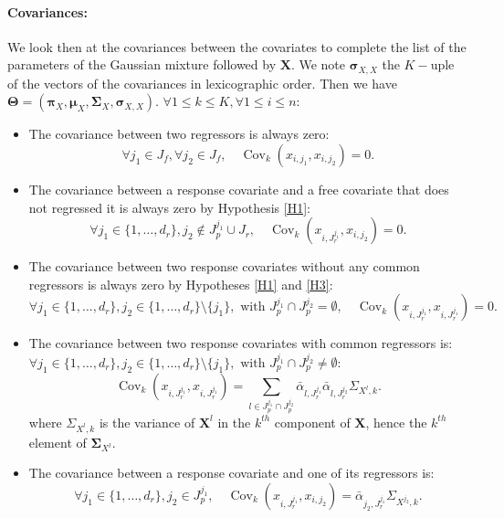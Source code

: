 \documentclass[12pt,a4paper]{report}
\begin{document}
\paragraph{Covariances:} We look then at the covariances between the covariates to complete the list of the parameters of the Gaussian mixture followed by $\boldsymbol{X}$.
We note $\boldsymbol{\sigma}_{X,X}$ the $K-$uple of the vectors of the covariances in lexicographic order. Then we have $\boldsymbol{\Theta}=(\boldsymbol{\pi}_X,\boldsymbol{\mu}_X,\boldsymbol{\Sigma}_X,\boldsymbol{\sigma}_{X,X})$. $\forall 1\leq k \leq K, \forall 1\leq i \leq n$:
\begin{itemize}
	\item The covariance between two regressors is always zero:
	\begin{equation}
		\forall j_1 \in J_f, \forall j_2 \in J_f, \quad   \operatorname{Cov}_k(x_{i,j_1},x_{i,j_2})=0. \nonumber 
	\end{equation}
	\item The covariance between a response covariate and a free covariate that does not regressed it is always zero by Hypothesis \ref{H1}:
	\begin{equation}
		\forall j_1 \in \{1,\dots,d_r \}, j_2 \notin J_p^{j_1}\cup J_r, \quad \operatorname{Cov}_k(x_{i,J_r^{j_1}},x_{i,j_2})=0. \nonumber 
	\end{equation}
	\item The covariance between two response covariates without any common regressors is always zero  by Hypotheses \ref{H1} and \ref{H3}:
	\begin{equation}
		\forall j_1 \in \{1,\dots,d_r \}, j_2 \in \{1,\dots, d_r \}\setminus\{ j_1 \}, \textrm{ with } J_p^{j_1}\cap J_p^{j_2}= \emptyset, \quad \operatorname{Cov}_k(x_{i,J_r^{j_1}},x_{i,J_r^{j_1}})=0. \nonumber 
	\end{equation}
	\item The covariance between two response covariates with common regressors is:\\
	$\forall j_1 \in \{1,\dots,d_r \}, j_2 \in \{1,\dots, d_r \}\setminus\{ j_1 \}, \textrm{ with } J_p^{j_1}\cap J_p^{j_2}\neq \emptyset$:
	\begin{equation}
	  \operatorname{Cov}_k(x_{i,J_r^{j_1}},x_{i,J_r^{j_1}})=\sum_{l \in J_p^{j_1}\cap J_p^{j_2}}\bar{\alpha}_{l,J_r^{j_1}}\bar{\alpha}_{l,J_r^{j_2}}\Sigma_{X^l,k} . \nonumber 
	\end{equation}
	where $\Sigma_{X^l,k}$ is the variance of $\boldsymbol{X}^l$ in the $k^{th}$ component of $\boldsymbol{X}$, hence the $k^{th}$ element of $\boldsymbol{\Sigma}_{X^l}$.
	\item The covariance between a response covariate and one of its regressors is:
	\begin{equation}
		\forall j_1 \in \{1,\dots, d_r\}, j_2 \in J_p^{j_1}, \quad \operatorname{Cov}_k(x_{i,J_r^{j_1}},x_{i,j_2})=\bar{\alpha}_{j_2,J_r^{j_1}}\Sigma_{X^{j_2},k} . \nonumber 
	\end{equation}
\end{itemize}
\end{document}
